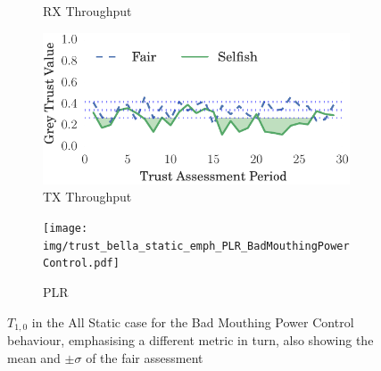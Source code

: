 \documentclass[runningheads,a4paper]{llncs}
\begin{document}
\begin{figure}
\begin{subfigure}{0.32\textwidth}
  \caption{RX Throughput}
  \label{fig:static_badmouthing_rxthroughput}
\end{subfigure}
\begin{subfigure}{0.32\textwidth}
\centering
  \includegraphics[width=.95\linewidth]{img/trust_bella_static_emph_TXThroughput_BadMouthingPowerControl.pdf}
  \caption{TX Throughput}
  \label{fig:static_badmouthing_txthroughput}
\end{subfigure}
\begin{subfigure}{0.32\textwidth}
\centering
  \texttt{[image: img/trust\_bella\_static\_emph\_PLR\_BadMouthingPowerControl.pdf]}
  \caption{PLR}
  \label{fig:static_badmouthing_plr}
\end{subfigure}
\caption{$T_{1,0}$ in the All Static case for the Bad Mouthing Power Control behaviour, emphasising a different metric in turn, also showing the mean and $\pm \sigma$ of the fair assessment}
\label{fig:static_badmouthing}
\end{figure}
\end{document}
